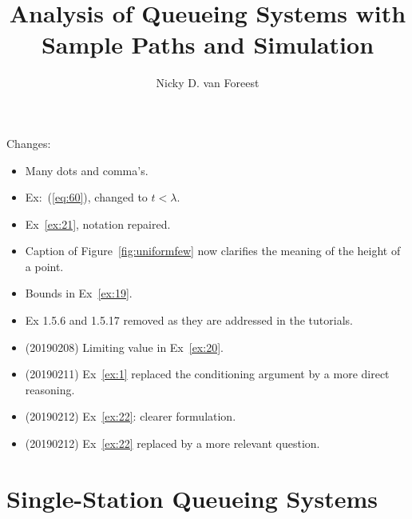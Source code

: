 \author{Nicky D. van  Foreest}
\title{Analysis of Queueing Systems with  Sample Paths and Simulation }


\maketitle

Changes:
\begin{itemize}
\item Many dots and comma's. 
\item Ex:~(\ref{eq:60}), changed to $t<\lambda$. 
\item Ex~\ref{ex:21}, notation repaired.
\item Caption of Figure~\ref{fig:uniformfew} now clarifies the meaning of the height of a point. 
\item Bounds in Ex~\ref{ex:19}.
\item Ex 1.5.6 and 1.5.17 removed as they are  addressed in the tutorials. 
\item (20190208) Limiting value in Ex~\ref{ex:20}. 
\item (20190211) Ex~\ref{ex:1} replaced the conditioning argument by a more direct reasoning.
\item (20190212) Ex~\ref{ex:22}: clearer formulation.
\item (20190212) Ex~\ref{ex:22} replaced by a more relevant question.
\end{itemize}

\tableofcontents




\chapter{Single-Station Queueing Systems}
\label{cha:single-stat-queu}



















%
 



%


